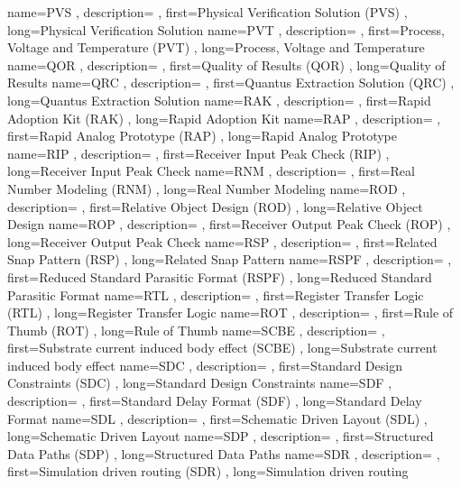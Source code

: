 { name={PVS}
, description={}
, first={Physical Verification Solution (PVS)}
, long={Physical Verification Solution}
}
{ name={PVT}
, description={}
, first={Process, Voltage and Temperature (PVT)}
, long={Process, Voltage and Temperature}
}
{ name={QOR}
, description={}
, first={Quality of Results (QOR)}
, long={Quality of Results}
}
{ name={QRC}
, description={}
, first={Quantus Extraction Solution (QRC)}
, long={Quantus Extraction Solution}
}
{ name={RAK}
, description={}
, first={Rapid Adoption Kit (RAK)}
, long={Rapid Adoption Kit}
}
{ name={RAP}
, description={}
, first={Rapid Analog Prototype (RAP)}
, long={Rapid Analog Prototype}
}
{ name={RIP}
, description={}
, first={Receiver Input Peak Check (RIP)}
, long={Receiver Input Peak Check}
}
{ name={RNM}
, description={}
, first={Real Number Modeling (RNM)}
, long={Real Number Modeling}
}
{ name={ROD}
, description={}
, first={Relative Object Design (ROD)}
, long={Relative Object Design}
}
{ name={ROP}
, description={}
, first={Receiver Output Peak Check (ROP)}
, long={Receiver Output Peak Check}
}
{ name={RSP}
, description={}
, first={Related Snap Pattern (RSP)}
, long={Related Snap Pattern}
}
{ name={RSPF}
, description={}
, first={Reduced Standard Parasitic Format (RSPF)}
, long={Reduced Standard Parasitic Format}
}
{ name={RTL}
, description={}
, first={Register Transfer Logic (RTL)}
, long={Register Transfer Logic}
}
{ name={ROT}
, description={}
, first={Rule of Thumb (ROT)}
, long={Rule of Thumb}
}
{ name={SCBE}
, description={}
, first={Substrate current induced body effect (SCBE)}
, long={Substrate current induced body effect}
}
{ name={SDC}
, description={}
, first={Standard Design Constraints (SDC)}
, long={Standard Design Constraints}
}
{ name={SDF}
, description={}
, first={Standard Delay Format (SDF)}
, long={Standard Delay Format}
}
{ name={SDL}
, description={}
, first={Schematic Driven Layout (SDL)}
, long={Schematic Driven Layout}
}
{ name={SDP}
, description={}
, first={Structured Data Paths (SDP)}
, long={Structured Data Paths}
}
{ name={SDR}
, description={}
, first={Simulation driven routing (SDR)}
, long={Simulation driven routing}
}
